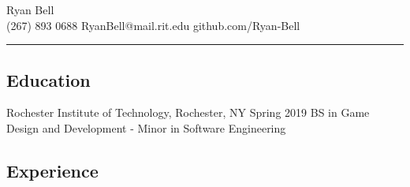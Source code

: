 \documentclass[10pt, letterpaper]{article}
\begin{document}
\begin{center}
Ryan Bell
\\
(267) 893 0688 \textbullet RyanBell@mail.rit.edu \textbullet github.com/Ryan-Bell
\end{center}

\hrule

\subsection*{Education}
Rochester Institute of Technology, Rochester, NY Spring 2019 BS in Game Design and Development - Minor in Software Engineering

\subsection*{Experience}
\end{document}

